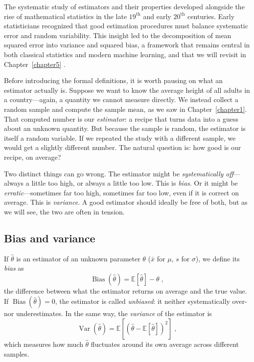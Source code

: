The systematic study of estimators and their properties developed alongside the rise of mathematical statistics in the late $19^{\text{th}}$ and early $20^{\text{th}}$ centuries. Early statisticians recognized that good estimation procedures must balance systematic error and random variability. This insight led to the decomposition of mean squared error into variance and squared bias, a framework that remains central in both classical statistics and modern machine learning, and that we will revisit in Chapter~\ref{chapter5} \cite{stigler_1986_history, rao_1973_linear, lehmann_1998_theory}.

\medskip

Before introducing the formal definitions, it is worth pausing on what an estimator actually is. Suppose we want to know the average height of all adults in a country---again, a quantity we cannot measure directly. We instead collect a random sample and compute the sample mean, as we saw in Chapter~\ref{chapter1}. That computed number is our \textit{estimator}: a recipe that turns data into a guess about an unknown quantity. But because the sample is random, the estimator is itself a random variable. If we repeated the study with a different sample, we would get a slightly different number. The natural question is: how good is our recipe, on average?

\medskip

Two distinct things can go wrong. The estimator might be \textit{systematically off}---always a little too high, or always a little too low. This is \textit{bias}. Or it might be \textit{erratic}---sometimes far too high, sometimes far too low, even if it is correct on average. This is \textit{variance}. A good estimator should ideally be free of both, but as we will see, the two are often in tension.

\subsection*{Bias and variance}

If $\hat{\theta}$ is an estimator of an unknown parameter $\theta$ ($\bar{x}$ for $\mu$, $s$ for $\sigma$), we define its \textit{bias} as
\begin{equation}
    \operatorname{Bias}(\hat{\theta}) = \mathbb{E}[\hat{\theta}] - \theta \; ,
\end{equation}
the difference between what the estimator returns on average and the true value. If $\operatorname{Bias}(\hat{\theta}) = 0$, the estimator is called \textit{unbiased}: it neither systematically over- nor underestimates. In the same way, the \textit{variance} of the estimator is
\begin{equation}
    \operatorname{Var}(\hat{\theta}) = \mathbb{E}\!\left[(\hat{\theta} - \mathbb{E}[\hat{\theta}])^2\right] \; ,
\end{equation}
which measures how much $\hat{\theta}$ fluctuates around its own average across different samples.

